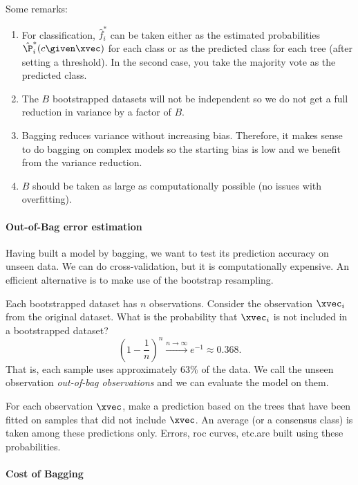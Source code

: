 Some remarks:
\begin{enumerate}
    \item For classification, $\hat{f}_i^*$ can be taken either as the estimated probabilities $\hat{\P}_i^*(c\given \xvec)$ for each class or as the predicted class for each tree (after setting a threshold). In the second case, you take the majority vote as the predicted class.
    \item The $B$ bootstrapped datasets will not be independent so we do not get a full reduction in variance by a factor of $B$. 
    \item Bagging reduces variance without increasing bias. Therefore, it makes sense to do bagging on complex models so the starting bias is low and we benefit from the variance reduction. 
    \item $B$ should be taken as large as computationally possible (no issues with overfitting).
\end{enumerate}

\paragraph{Out-of-Bag error estimation}

Having built a model by bagging, we want to test its prediction accuracy on unseen data. We can do cross-validation, but it is computationally expensive. An efficient alternative is to make use of the bootstrap resampling.

\begin{note}
    Each bootstrapped dataset has $n$ observations. Consider the observation $\xvec_i$ from the original dataset. What is the probability that $\xvec_i$ is not included in a bootstrapped dataset?
    \begin{equation}
        \left(1 - \frac{1}{n}\right)^n \xrightarrow{n\to\infty} e^{-1} \approx 0.368\text{.}
    \end{equation}
    That is, each sample uses approximately $63\%$ of the data. We call the unseen observation \emph{out-of-bag observations} and we can evaluate the model on them.
\end{note}

For each observation $\xvec$, make a prediction based on the trees that have been fitted on samples that did not include $\xvec$. An average (or a consensus class) is taken among these predictions only. Errors, \acs{roc} curves, etc.\@ are built using these probabilities.

\paragraph{Cost of Bagging}

